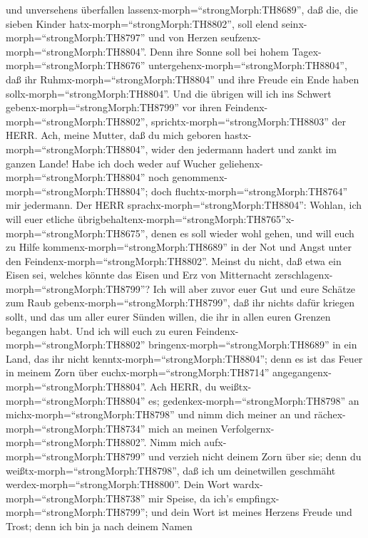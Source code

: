 und unversehens überfallen lassenx-morph=``strongMorph:TH8689'',
 daß die, die sieben Kinder
hatx-morph=``strongMorph:TH8802'', soll elend
seinx-morph=``strongMorph:TH8797'' und von Herzen
seufzenx-morph=``strongMorph:TH8804''. Denn ihre Sonne soll bei hohem
Tagex-morph=``strongMorph:TH8676''
untergehenx-morph=``strongMorph:TH8804'', daß ihr
Ruhmx-morph=``strongMorph:TH8804'' und ihre Freude ein Ende haben
sollx-morph=``strongMorph:TH8804''. Und die übrigen will ich ins Schwert
gebenx-morph=``strongMorph:TH8799'' vor ihren
Feindenx-morph=``strongMorph:TH8802'',
sprichtx-morph=``strongMorph:TH8803'' der HERR.  Ach, meine
Mutter, daß du mich geboren hastx-morph=``strongMorph:TH8804'', wider
den jedermann hadert und zankt im ganzen Lande! Habe ich doch weder auf
Wucher geliehenx-morph=``strongMorph:TH8804'' noch
genommenx-morph=``strongMorph:TH8804''; doch
fluchtx-morph=``strongMorph:TH8764'' mir jedermann.  Der
HERR sprachx-morph=``strongMorph:TH8804'': Wohlan, ich will euer etliche
übrigbehaltenx-morph=``strongMorph:TH8765''\textbar x-morph=``strongMorph:TH8675'',
denen es soll wieder wohl gehen, und will euch zu Hilfe
kommenx-morph=``strongMorph:TH8689'' in der Not und Angst unter den
Feindenx-morph=``strongMorph:TH8802''.  Meinst du nicht,
daß etwa ein Eisen sei, welches könnte das Eisen und Erz von Mitternacht
zerschlagenx-morph=``strongMorph:TH8799''?  Ich will aber
zuvor euer Gut und eure Schätze zum Raub
gebenx-morph=``strongMorph:TH8799'', daß ihr nichts dafür kriegen sollt,
und das um aller eurer Sünden willen, die ihr in allen euren Grenzen
begangen habt.  Und ich will euch zu euren
Feindenx-morph=``strongMorph:TH8802''
bringenx-morph=``strongMorph:TH8689'' in ein Land, das ihr nicht
kenntx-morph=``strongMorph:TH8804''; denn es ist das Feuer in meinem
Zorn über euchx-morph=``strongMorph:TH8714''
angegangenx-morph=``strongMorph:TH8804''.  Ach HERR, du
weißtx-morph=``strongMorph:TH8804'' es;
gedenkex-morph=``strongMorph:TH8798'' an
michx-morph=``strongMorph:TH8798'' und nimm dich meiner an und
rächex-morph=``strongMorph:TH8734'' mich an meinen
Verfolgernx-morph=``strongMorph:TH8802''. Nimm mich
aufx-morph=``strongMorph:TH8799'' und verzieh nicht deinem Zorn über
sie; denn du weißtx-morph=``strongMorph:TH8798'', daß ich um
deinetwillen geschmäht werdex-morph=``strongMorph:TH8800''.
 Dein Wort wardx-morph=``strongMorph:TH8738'' mir Speise,
da ich's empfingx-morph=``strongMorph:TH8799''; und dein Wort ist meines
Herzens Freude und Trost; denn ich bin ja nach deinem Namen
